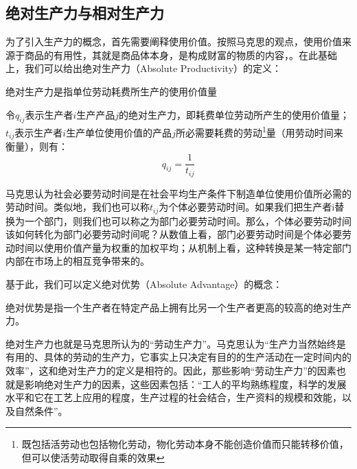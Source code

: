 \subsection{绝对生产力与相对生产力}

为了引入生产力的概念，首先需要阐释使用价值。按照马克思的观点，使用价值来源于商品的有用性，其就是商品体本身，是构成财富的物质的内容，\cite[48-49]{ZhongGongZhongYangMaKeSiEnGeSiLieNingSiDaLinZhuZuoBianYiJuMaKeSiEnGeSiWenJiDi5Juan2009}。在此基础上，我们可以给出绝对生产力（Absolute Productivity）的定义：

\begin{definition}
    绝对生产力是指单位劳动耗费所生产的使用价值量\cite[47]{CaiJiMingCongXiaYiJieZhiLunDaoGuangYiJieZhiLunXiuDingBan2022}
\end{definition}

令$q_{ij}$表示生产者$i$生产产品$j$的绝对生产力，即耗费单位劳动所产生的使用价值量；$t_{ij}$表示生产者$i$生产单位使用价值的产品$j$所必需要耗费的劳动\footnote{既包括活劳动也包括物化劳动，物化劳动本身不能创造价值而只能转移价值，但可以使活劳动取得自乘的效果\cite{ChengEnFuXinDeHuoLaoDongJieZhiYiYuanLunLaoDongJieZhiLiLunDeDangDaiTuoZhan2001}}量（用劳动时间来衡量\cite[51]{ZhongGongZhongYangMaKeSiEnGeSiLieNingSiDaLinZhuZuoBianYiJuMaKeSiEnGeSiWenJiDi5Juan2009}），则有：
\begin{equation}
    \label{jueduishengchanli}
    q_{ij}=\frac{1}{t_{ij}}
\end{equation}

马克思认为社会必要劳动时间是在社会平均生产条件下制造单位使用价值所必需的劳动时间\cite[52]{ZhongGongZhongYangMaKeSiEnGeSiLieNingSiDaLinZhuZuoBianYiJuMaKeSiEnGeSiWenJiDi5Juan2009}。类似地，我们也可以称$t_{ij}$为个体必要劳动时间。如果我们把生产者i替换为一个部门，则我们也可以称之为部门必要劳动时间。那么，个体必要劳动时间该如何转化为部门必要劳动时间呢？从数值上看，部门必要劳动时间是个体必要劳动时间以使用价值产量为权重的加权平均\cite[53]{LinGangGuanYuSheHuiBiYaoLaoDongShiJianYiJiLaoDongShengChanLuYuJieZhiLiangGuanXiWenTiDeTanTao2005}；从机制上看，这种转换是某一特定部门内部在市场上的相互竞争带来的。

基于此，我们可以定义绝对优势（Absolute Advantage）的概念：

\begin{definition}
    绝对优势是指一个生产者在特定产品上拥有比另一个生产者更高的较高的绝对生产力。
\end{definition}

绝对生产力也就是马克思所认为的“劳动生产力”。马克思认为“生产力当然始终是有用的、具体的劳动的生产力，它事实上只决定有目的的生产活动在一定时间内的效率”\cite[59]{ZhongGongZhongYangMaKeSiEnGeSiLieNingSiDaLinZhuZuoBianYiJuMaKeSiEnGeSiWenJiDi5Juan2009}，这和绝对生产力的定义是相符的。因此，那些影响“劳动生产力”的因素也就是影响绝对生产力的因素，这些因素包括：“工人的平均熟练程度，科学的发展水平和它在工艺上应用的程度，生产过程的社会结合，生产资料的规模和效能，以及自然条件”\cite[53]{ZhongGongZhongYangMaKeSiEnGeSiLieNingSiDaLinZhuZuoBianYiJuMaKeSiEnGeSiWenJiDi5Juan2009}。

